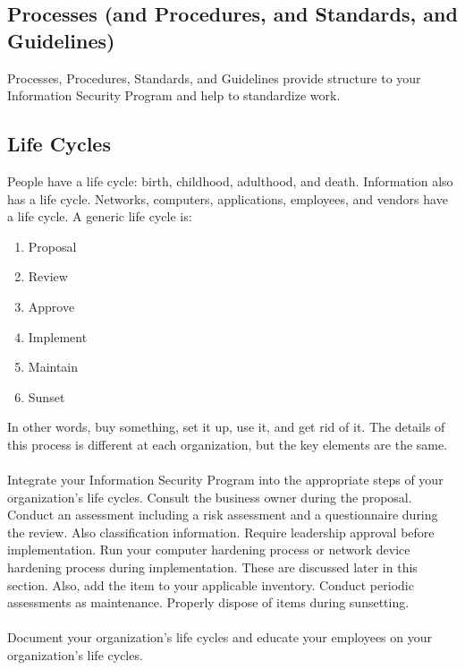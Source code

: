 \subsection{Processes (and Procedures, and Standards, and Guidelines)}
Processes, Procedures, Standards, and Guidelines provide structure to your Information Security Program and help to standardize work.
\subsection{Life Cycles}\label{subsubsec:"Computer Lifecycle"}
People have a life cycle: birth, childhood, adulthood, and death. Information also has a life cycle. Networks, computers, applications, employees, and vendors have a life cycle. A generic life cycle is:
\begin{enumerate}
\item Proposal
\item Review
\item Approve
\item Implement
\item Maintain
\item Sunset
\end{enumerate}
In other words, buy something, set it up, use it, and get rid of it. The details of this process is different at each organization, but the key elements are the same.\\\\
Integrate your Information Security Program into the appropriate steps of your organization's life cycles. Consult the business owner during the proposal. Conduct an assessment including a risk assessment and a questionnaire during the review. Also classification information. Require leadership approval before implementation. Run your computer hardening process or network device hardening process during implementation. These are discussed later in this section. Also, add the item to your applicable inventory. Conduct periodic assessments as maintenance. Properly dispose of items during sunsetting.\\\\
Document your organization's life cycles and educate your employees on your organization's life cycles.

